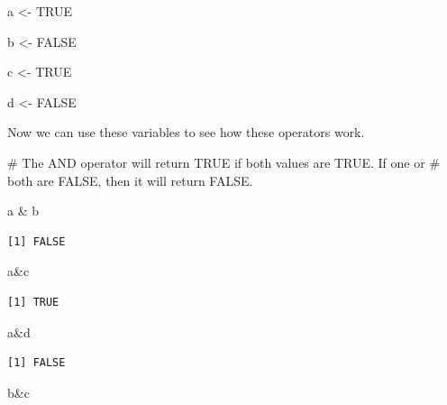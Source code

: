 \documentclass[
  letterpaper,
  DIV=11,
  numbers=noendperiod]{scrreprt}
\newenvironment{Shaded}{\begin{snugshade}}{\end{snugshade}}
\newcommand{\CommentTok}[1]{\textcolor[rgb]{0.37,0.37,0.37}{#1}}
\newcommand{\ConstantTok}[1]{\textcolor[rgb]{0.56,0.35,0.01}{#1}}
\newcommand{\NormalTok}[1]{\textcolor[rgb]{0.00,0.23,0.31}{#1}}
\newcommand{\OtherTok}[1]{\textcolor[rgb]{0.00,0.23,0.31}{#1}}
\newcommand{\SpecialCharTok}[1]{\textcolor[rgb]{0.37,0.37,0.37}{#1}}
\begin{document}
\begin{Shaded}
\begin{Highlighting}[]
\NormalTok{a }\OtherTok{\textless{}{-}} \ConstantTok{TRUE}

\NormalTok{b }\OtherTok{\textless{}{-}} \ConstantTok{FALSE}

\NormalTok{c }\OtherTok{\textless{}{-}} \ConstantTok{TRUE}

\NormalTok{d }\OtherTok{\textless{}{-}} \ConstantTok{FALSE}
\end{Highlighting}
\end{Shaded}

Now we can use these variables to see how these operators work.

\begin{Shaded}
\begin{Highlighting}[]
\CommentTok{\# The AND operator will return TRUE if both values are TRUE. If one or }
\CommentTok{\# both are FALSE, then it will return FALSE.}

\NormalTok{a }\SpecialCharTok{\&}\NormalTok{ b}
\end{Highlighting}
\end{Shaded}

\begin{verbatim}
[1] FALSE
\end{verbatim}

\begin{Shaded}
\begin{Highlighting}[]
\NormalTok{a}\SpecialCharTok{\&}\NormalTok{c}
\end{Highlighting}
\end{Shaded}

\begin{verbatim}
[1] TRUE
\end{verbatim}

\begin{Shaded}
\begin{Highlighting}[]
\NormalTok{a}\SpecialCharTok{\&}\NormalTok{d}
\end{Highlighting}
\end{Shaded}

\begin{verbatim}
[1] FALSE
\end{verbatim}

\begin{Shaded}
\begin{Highlighting}[]
\NormalTok{b}\SpecialCharTok{\&}\NormalTok{c}
\end{Highlighting}
\end{Shaded}
\end{document}
